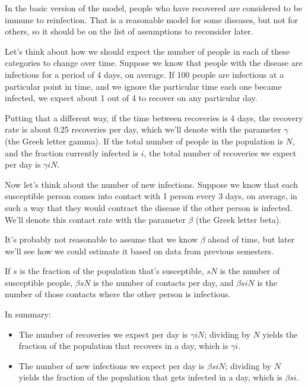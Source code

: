 \documentclass[12pt]{book}
\theoremstyle{exercise}
\begin{document}
In the basic version of the model, people who have recovered are considered to be immune to reinfection.  That is a reasonable model for some diseases, but not for others, so it should be on the list of assumptions to reconsider later.

Let's think about how we should expect the number of people in each of these categories to change over time.  Suppose we know that people with the disease are infectious for a period of 4 days, on average.  If 100 people are infectious at a particular point in time, and we ignore the particular time each one became infected, we expect about 1 out of 4 to recover on any particular day.

Putting that a different way, if the time between recoveries is 4 days, the recovery rate is about 0.25 recoveries per day, which we'll denote with the parameter $\gamma$ (the Greek letter gamma).  If the total number of people in the population is $N$, and the fraction currently infected is $i$, the total number of recoveries we expect per day is $\gamma i N$.

Now let's think about the number of new infections.  Suppose we know that each susceptible person comes into contact with 1 person every 3 days, on average, in such a way that they would contract the disease if the other person is infected.  We'll denote this contact rate with the parameter $\beta$ (the Greek letter beta).

It's probably not reasonable to assume that we know $\beta$ ahead of time, but later we'll see how we could estimate it based on data from previous semesters.

If $s$ is the fraction of the population that's susceptible, $s N$ is the number of susceptible people, $\beta s N$ is the number of contacts per day, and $\beta s i N$ is the number of those contacts where the other person is infectious.

In summary:

\begin{itemize}

\item The number of recoveries we expect per day is $\gamma i N$; dividing by $N$ yields the fraction of the population that recovers in a day, which is $\gamma i$.

\item The number of new infections we expect per day is $\beta s i N$; dividing by $N$ yields the fraction of the population that gets infected in a day, which is $\beta s i$.

\end{itemize}
\end{document}
